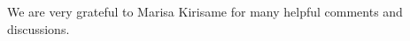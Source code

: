 \documentclass[acmsmall,10pt,review,screen,anonymous]{acmart}
\begin{document}




\begin{acks}

We are very grateful to Marisa Kirisame for many helpful comments and discussions.

\end{acks}


\end{document}
